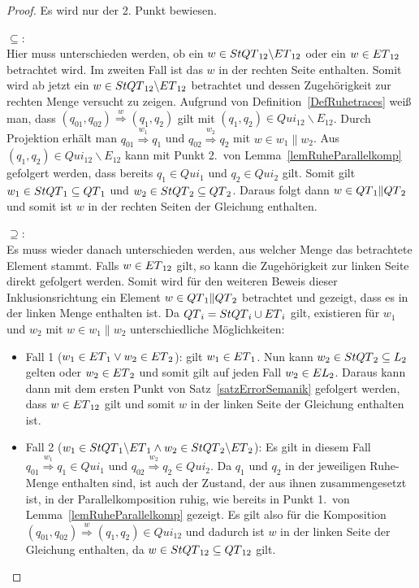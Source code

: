 \begin{proof}
  Es wird nur der 2. Punkt bewiesen.

  \glqq{}$\subseteq$\grqq{}:\\
  Hier muss unterschieden werden, ob ein $w\in StQT{}_{12}\backslash ET{}_{12}$
  oder ein $w\in ET{}_{12}$ betrachtet wird. Im zweiten Fall ist das
  $w$ in der rechten Seite enthalten. Somit wird ab jetzt ein $w\in
  StQT{}_{12}\backslash ET{}_{12}$ betrachtet und dessen Zugehörigkeit zur
  rechten Menge versucht zu zeigen. Aufgrund von
  Definition~\ref{DefRuhetraces} weiß man, dass $(q_{01},q_{02})
  \overset{w}{\Rightarrow} (q_1,q_2)$ gilt mit $(q_1,q_2)\in Qui_{12}\backslash
  E_{12}$. Durch Projektion erhält man $q_{01} \overset{w_1}{\Rightarrow} q_1$
  und $q_{02} \overset{w_2}{\Rightarrow} q_2$ mit $w\in w_1\|w_2$. Aus
  $(q_1,q_2)\in Qui_{12}\backslash E_{12}$ kann mit Punkt 2.\ von
  Lemma~\ref{lemRuheParallelkomp} gefolgert werden, dass bereits $q_1\in Qui_1$
  und $q_2\in Qui_2$ gilt. Somit gilt $w_1\in StQT{}_1\subseteq QT{}_1$ und
  $w_2\in StQT{}_2\subseteq QT{}_2$. Daraus folgt dann $w\in
  QT{}_1\|QT{}_2$ und somit ist $w$ in der rechten Seiten der Gleichung
  enthalten.

  \glqq{}$\supseteq$\grqq{}:\\
  Es muss wieder danach unterschieden werden, aus welcher Menge das betrachtete
  Element stammt. Falls $w\in ET{}_{12}$ gilt, so kann die
  Zugehörigkeit zur linken Seite direkt gefolgert werden. Somit wird für den
  weiteren Beweis dieser Inklusionsrichtung ein Element $w\in QT{}_1\|QT{}_2$
  betrachtet und gezeigt, dass es in der linken Menge enthalten ist. Da
  $QT{}_i = StQT{}_i\cup ET{}_i$ gilt, existieren für $w_1$ und $w_2$ mit
  $w\in w_1\| w_2$ unterschiedliche Möglichkeiten:
  \begin{itemize}
    \item Fall 1 ($w_1\in ET{}_1\vee w_2\in ET{}_2$): \OBdA{} gilt
      $w_1\in ET{}_1$. Nun kann $w_2\in StQT{}_2\subseteq L_2$ gelten
      oder $w_2\in ET{}_2$ und somit gilt auf jeden Fall $w_2\in
      EL{}_2$. Daraus kann dann mit dem ersten Punkt von
      Satz~\ref{satzErrorSemanik} gefolgert werden, dass $w\in ET{}_{12}$ gilt
      und somit $w$ in der linken Seite der Gleichung enthalten ist.
    \item Fall 2 ($w_1\in StQT{}_1\backslash ET{}_1\wedge w_2\in
      StQT{}_2\backslash ET{}_2$): Es gilt in diesem Fall $q_{01}
      \overset{w_1}{\Rightarrow} q_1\in Qui_1$ und $q_{02}
      \overset{w_2}{\Rightarrow} q_2\in Qui_2$. Da $q_1$ und $q_2$ in der
      jeweiligen Ruhe-Menge enthalten sind, ist auch der Zustand, der aus ihnen
      zusammengesetzt ist, in der Parallelkomposition ruhig, wie bereits in Punkt 1.\ von
      Lemma~\ref{lemRuheParallelkomp} gezeigt. Es gilt also für die Komposition
      $(q_{01},q_{02}) \overset{w}{\Rightarrow} (q_1,q_2)\in Qui_{12}$ und
      dadurch ist $w$ in der linken Seite der Gleichung enthalten, da $w\in
      StQT{}_{12}\subseteq QT{}_{12}$ gilt.
  \end{itemize}
\end{proof}

